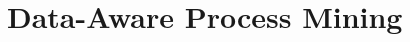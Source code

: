 \begin{comment}
    In this section, you are going to list all the related work.
In this template, the related work section is located directly after the introduction chapter, however, this is not always the best/most logical location.
As a general guideline, the position of the related work section can be:
\begin{itemize}
    \item \emph{Directly after the introduction}; Position the related work section here, in case you do not need to refer to any detailed (mathematical) concepts.
    Furthermore, you do not need to refer to any part of your solution. 
    Positioning the related work section here is most commonly done if you are really uncovering ``new terrain'', i.e., you are doing something \emph{very novel}.
    \item \emph{Directly after preliminaries}; In this scenario, you swap the related work and preliminaries, i.e., w.r.t. this thesis template.
    Position this here when you do need to refer to some of the (mathematical) concepts (typically presented in the preliminaries), yet, you do not need to use any properties of your own solution when comparing your work to the related literature.
    \item \emph{Directly before the Conclusion (typically after the Evaluation)}; Position the related work section here, in case you need to compare the related work against properties of your algorithm and/or the results you have obtained.
\end{itemize}

In some cases, you can introduce sub-sections in this chapter, i.e., if a division of the related work eases the readability.

Note that the related work is not intended for you to \enquote{Convince your supervisors that you have studied a lot of papers}.
Rather, you simply describe in 1, max 2 lines what the core idea of a paper is, how it relates to your work and why it is different from your work.
In some cases, it is possible to discuss the aforementioned points for a selection of papers rather than a single paper.
Try to present the paper along logical lines, i.e., define categories of work and introduce subsections for this.
Never present a long 2-page list of randomly/chronologically structured work.
Always add a decent structure!
\end{comment}

\section{Data-Aware Process Mining}

